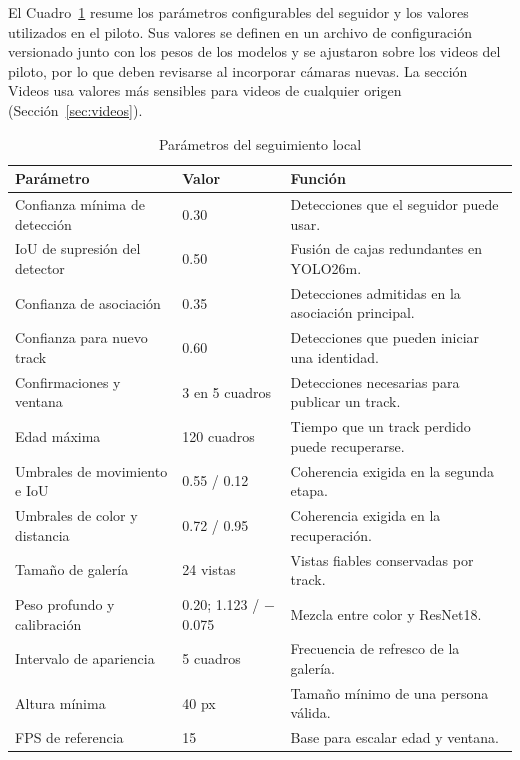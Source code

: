 \documentclass[12pt,a4paper]{article}
\begin{document}
El Cuadro~\ref{tab:tracker_params} resume los parámetros configurables
del seguidor y los valores utilizados en el piloto. Sus valores se
definen en un archivo de configuración versionado junto con los pesos de
los modelos y se ajustaron sobre los videos del piloto, por lo que deben
revisarse al incorporar cámaras nuevas. La sección Videos usa valores más
sensibles para videos de cualquier origen (Sección~\ref{sec:videos}).

\begin{table}[H]
\caption{Parámetros del seguimiento local}
\label{tab:tracker_params}
\centering
\footnotesize
\begin{tabular}{|p{}|p{}|p{}|}
\hline
\textbf{Parámetro} & \textbf{Valor} & \textbf{Función} \\
\hline
Confianza mínima de detección & 0.30 & Detecciones que el seguidor puede usar. \\
\hline
IoU de supresión del detector & 0.50 & Fusión de cajas redundantes en YOLO26m. \\
\hline
Confianza de asociación & 0.35 & Detecciones admitidas en la asociación principal. \\
\hline
Confianza para nuevo track & 0.60 & Detecciones que pueden iniciar una identidad. \\
\hline
Confirmaciones y ventana & 3 en 5 cuadros & Detecciones necesarias para publicar un track. \\
\hline
Edad máxima & 120 cuadros & Tiempo que un track perdido puede recuperarse. \\
\hline
Umbrales de movimiento e IoU & 0.55 / 0.12 & Coherencia exigida en la segunda etapa. \\
\hline
Umbrales de color y distancia & 0.72 / 0.95 & Coherencia exigida en la recuperación. \\
\hline
Tamaño de galería & 24 vistas & Vistas fiables conservadas por track. \\
\hline
Peso profundo y calibración & 0.20; 1.123 / $-$0.075 & Mezcla entre color y ResNet18. \\
\hline
Intervalo de apariencia & 5 cuadros & Frecuencia de refresco de la galería. \\
\hline
Altura mínima & 40 px & Tamaño mínimo de una persona válida. \\
\hline
FPS de referencia & 15 & Base para escalar edad y ventana. \\
\hline
\end{tabular}
\end{table}
\end{document}
